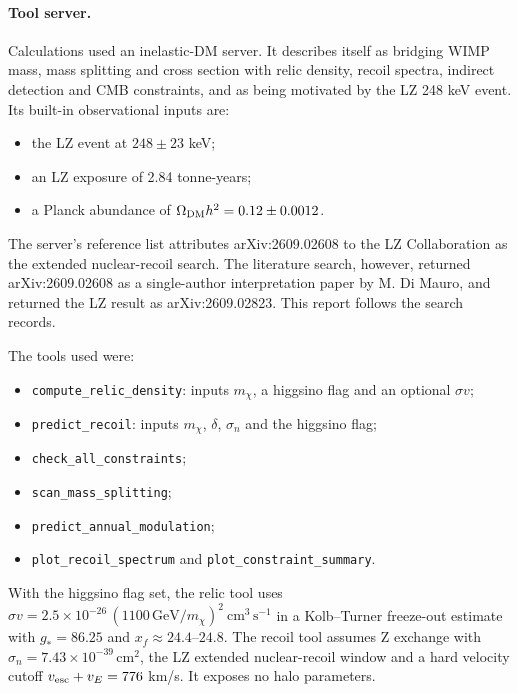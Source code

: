 \documentclass[11pt,a4paper]{article}
\begin{document}
\paragraph{Tool server.} Calculations used an inelastic-DM server. It describes itself as bridging WIMP mass, mass splitting and cross section with relic density, recoil spectra, indirect detection and CMB constraints, and as being motivated by the LZ 248 keV event. Its built-in observational inputs are:
\begin{itemize}
\item the LZ event at $248\pm23$ keV;
\item an LZ exposure of 2.84 tonne-years;
\item a Planck abundance of $\Omega_{\rm DM}h^2 = 0.12\pm0.0012$.
\end{itemize}
The server's reference list attributes arXiv:2609.02608 to the LZ Collaboration as the extended nuclear-recoil search. The literature search, however, returned arXiv:2609.02608 as a single-author interpretation paper by M. Di Mauro, and returned the LZ result as arXiv:2609.02823. This report follows the search records.

The tools used were:
\begin{itemize}
\item \texttt{compute\_relic\_density}: inputs $m_\chi$, a higgsino flag and an optional $\sigma v$;
\item \texttt{predict\_recoil}: inputs $m_\chi$, $\delta$, $\sigma_n$ and the higgsino flag;
\item \texttt{check\_all\_constraints};
\item \texttt{scan\_mass\_splitting};
\item \texttt{predict\_annual\_modulation};
\item \texttt{plot\_recoil\_spectrum} and \texttt{plot\_constraint\_summary}.
\end{itemize}

With the higgsino flag set, the relic tool uses $\sigma v = 2.5\times10^{-26}\,(1100\,\mathrm{GeV}/m_\chi)^2\ \mathrm{cm^3\,s^{-1}}$ in a Kolb--Turner freeze-out estimate with $g_* = 86.25$ and $x_f \approx 24.4$--$24.8$. The recoil tool assumes Z exchange with $\sigma_n = 7.43\times10^{-39}\,\mathrm{cm^2}$, the LZ extended nuclear-recoil window and a hard velocity cutoff $v_{\rm esc}+v_E = 776$ km/s. It exposes no halo parameters.
\end{document}
